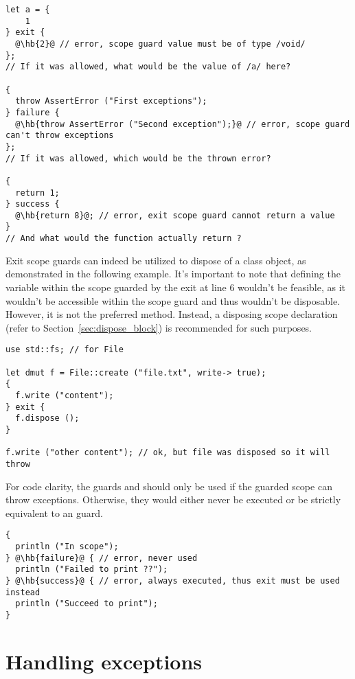 \begin{lstlisting}[style=coloredverbatim, escapechar=@]
let a = {
    1
} exit {
  @\hb{2}@ // error, scope guard value must be of type /void/
};
// If it was allowed, what would be the value of /a/ here?

{
  throw AssertError ("First exceptions");
} failure {
  @\hb{throw AssertError ("Second exception");}@ // error, scope guard can't throw exceptions
};
// If it was allowed, which would be the thrown error?

{
  return 1;
} success {
  @\hb{return 8}@; // error, exit scope guard cannot return a value
}
// And what would the function actually return ?
\end{lstlisting}

Exit scope guards can indeed be utilized to dispose of a class object, as
demonstrated in the following example. It's important to note that defining the
variable  within the scope guarded by the exit at line 6 wouldn't be
feasible, as it wouldn't be accessible within the scope guard and thus wouldn't
be disposable. However, it is not the preferred method. Instead, a disposing
scope declaration (refer to Section~\ref{sec:dispose_block}) is recommended for
such purposes.

\begin{lstlisting}[style=coloredverbatim]
use std::fs; // for File

let dmut f = File::create ("file.txt", write-> true);
{
  f.write ("content");
} exit {
  f.dispose ();
}

f.write ("other content"); // ok, but file was disposed so it will throw
\end{lstlisting}

For code clarity, the guards  and  should only be
used if the guarded scope can throw exceptions. Otherwise, they would either
never be executed or be strictly equivalent to an  guard.

\begin{lstlisting}[style=coloredverbatim, escapechar=@]
{
  println ("In scope");
} @\hb{failure}@ { // error, never used
  println ("Failed to print ??");
} @\hb{success}@ { // error, always executed, thus exit must be used instead
  println ("Succeed to print");
}
\end{lstlisting}

\section{Handling exceptions}
\label{sec:catching_errors}


